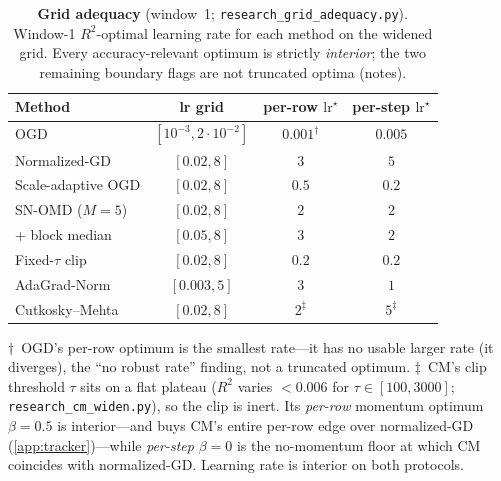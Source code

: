 \documentclass{article}
\begin{document}
\begin{table}[t]
\caption{\textbf{Grid adequacy} (window~1; \texttt{research\_grid\_adequacy.py}). Window-1
$R^2$-optimal learning rate for each method on the widened grid. Every accuracy-relevant
optimum is strictly \emph{interior}; the two remaining boundary flags are not truncated optima
(notes).}
\label{tab:grid}
\centering
\begin{small}
\begin{tabular}{lccc}
\toprule
Method & lr grid & per-row $\mathrm{lr}^\star$ & per-step $\mathrm{lr}^\star$ \\
\midrule
OGD                    & $[10^{-3},2{\cdot}10^{-2}]$ & $0.001^\dagger$ & $0.005$ \\
Normalized-GD          & $[0.02,8]$   & $3$   & $5$ \\
Scale-adaptive OGD     & $[0.02,8]$   & $0.5$ & $0.2$ \\
SN-OMD ($M{=}5$)       & $[0.02,8]$   & $2$   & $2$ \\
\quad + block median   & $[0.05,8]$   & $3$   & $2$ \\
Fixed-$\tau$ clip      & $[0.02,8]$   & $0.2$ & $0.2$ \\
AdaGrad-Norm           & $[0.003,5]$  & $3$   & $1$ \\
Cutkosky--Mehta        & $[0.02,8]$   & $2^\ddagger$ & $5^\ddagger$ \\
\bottomrule
\end{tabular}
\end{small}

\smallskip
{\footnotesize $\dagger$~OGD's per-row optimum is the smallest rate---it has no usable larger
rate (it diverges), the ``no robust rate'' finding, not a truncated optimum. $\ddagger$~CM's
clip threshold $\tau$ sits on a flat plateau ($R^2$ varies ${<}0.006$ for $\tau\in[100,3000]$;
\texttt{research\_cm\_widen.py}), so the clip is inert. Its \emph{per-row} momentum optimum
$\beta{=}0.5$ is interior---and buys CM's entire per-row edge over normalized-GD
(\cref{app:tracker})---while \emph{per-step} $\beta{=}0$ is the no-momentum floor at which CM
coincides with normalized-GD. Learning rate is interior on both protocols.}
\end{table}
\end{document}
